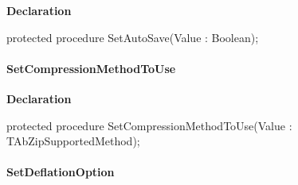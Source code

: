 \documentclass{report}
\newif\ifpdf
\begin{document}
\label{AbZipper.TAbCustomZipper-SetAutoSave}
\begin{list}{}{
\setlength{\itemindent}{0cm}
\setlength{\listparindent}{0cm}
\setlength{\leftmargin}{\evensidemargin}
\addtolength{\leftmargin}{\tmplength}
\settowidth{\labelsep}{X}
\addtolength{\leftmargin}{\labelsep}
\setlength{\labelwidth}{\tmplength}
}
\item[\textbf{Declaration}\hfill]
\ifpdf
\begin{flushleft}
\fi
\begin{ttfamily}
protected procedure SetAutoSave(Value : Boolean);\end{ttfamily}

\ifpdf
\end{flushleft}
\fi

\end{list}
\paragraph*{SetCompressionMethodToUse}\hspace*{\fill}

\label{AbZipper.TAbCustomZipper-SetCompressionMethodToUse}
\begin{list}{}{
\setlength{\itemindent}{0cm}
\setlength{\listparindent}{0cm}
\setlength{\leftmargin}{\evensidemargin}
\addtolength{\leftmargin}{\tmplength}
\settowidth{\labelsep}{X}
\addtolength{\leftmargin}{\labelsep}
\setlength{\labelwidth}{\tmplength}
}
\item[\textbf{Declaration}\hfill]
\ifpdf
\begin{flushleft}
\fi
\begin{ttfamily}
protected procedure SetCompressionMethodToUse(Value : TAbZipSupportedMethod);\end{ttfamily}

\ifpdf
\end{flushleft}
\fi

\end{list}
\paragraph*{SetDeflationOption}\hspace*{\fill}
\end{document}
